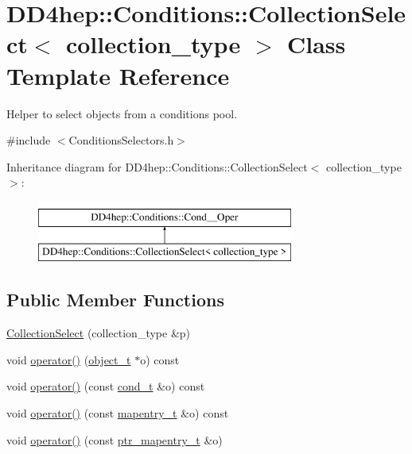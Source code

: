 \hypertarget{class_d_d4hep_1_1_conditions_1_1_collection_select}{}\section{D\+D4hep\+:\+:Conditions\+:\+:Collection\+Select$<$ collection\+\_\+type $>$ Class Template Reference}
\label{class_d_d4hep_1_1_conditions_1_1_collection_select}


Helper to select objects from a conditions pool.  




{\ttfamily \#include $<$Conditions\+Selectors.\+h$>$}

Inheritance diagram for D\+D4hep\+:\+:Conditions\+:\+:Collection\+Select$<$ collection\+\_\+type $>$\+:\begin{figure}[H]
\begin{center}
\leavevmode
\includegraphics[height=2.000000cm]{class_d_d4hep_1_1_conditions_1_1_collection_select}
\end{center}
\end{figure}
\subsection*{Public Member Functions}
\begin{DoxyCompactItemize}
\item 
\hyperlink{class_d_d4hep_1_1_conditions_1_1_collection_select_a879f557b25aae1cd0608484eb0524929}{Collection\+Select} (collection\+\_\+type \&p)
\item 
void \hyperlink{class_d_d4hep_1_1_conditions_1_1_collection_select_a9c34ccb3f513f59eaceda89c9ab1bf0c}{operator()} (\hyperlink{class_d_d4hep_1_1_conditions_1_1_cond_____oper_a4229491e49bfd21058dff10125a73f63}{object\+\_\+t} $\ast$o) const
\item 
void \hyperlink{class_d_d4hep_1_1_conditions_1_1_collection_select_a23f47d76995dead2d8998a98978d1168}{operator()} (const \hyperlink{class_d_d4hep_1_1_conditions_1_1_cond_____oper_aceca9f6a0e8c84364946eace47275d09}{cond\+\_\+t} \&o) const
\item 
void \hyperlink{class_d_d4hep_1_1_conditions_1_1_collection_select_aa4e171a7d3f3d28bdbe47ff4dcfac3f6}{operator()} (const \hyperlink{class_d_d4hep_1_1_conditions_1_1_cond_____oper_a877dac3da66795207aed15be219acbdc}{mapentry\+\_\+t} \&o) const
\item 
void \hyperlink{class_d_d4hep_1_1_conditions_1_1_collection_select_a8015cdd01adc5d11fc52062df45e961e}{operator()} (const \hyperlink{class_d_d4hep_1_1_conditions_1_1_cond_____oper_a0949e4bd5f90cd3fae2394cf30983973}{ptr\+\_\+mapentry\+\_\+t} \&o)
\end{DoxyCompactItemize}
